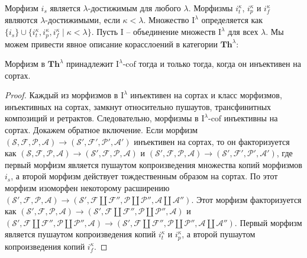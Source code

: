 \documentclass[reqno]{amsart}
\theoremstyle{definition}
\theoremstyle{remark}
\newcommand{\bcat}[1]{\mathbf{#1}}
\newcommand{\Th}{\bcat{Th}}
\newcommand{\I}{\mathrm{I}}
\newcommand{\class}[2]{#1\text{-}\mathrm{#2}}
\newcommand{\Icof}[1][\I]{\class{#1}{cof}}
\begin{document}
Морфизм $i_s$ является $\lambda$-достижимым для любого $\lambda$.
Морфизмы $i_t^\kappa$, $i_p^\kappa$ и $i_f^\kappa$ являются $\lambda$-достижимыми, если $\kappa < \lambda$.
Множество $\I^\lambda$ определяется как $\{ i_s \} \cup \{ i_t^\kappa, i_p^\kappa, i_f^\kappa \mid \kappa < \lambda \}$.
Пусть $\I$ -- объединение множеств $\I^\lambda$ для всех $\lambda$.
Мы можем привести явное описание корасслоений в категории $\Th^\lambda$:

\begin{prop}[th-cof]
Морфизм в $\Th^\lambda$ принадлежит $\Icof[\I^\lambda]$ тогда и только тогда, когда он инъективен на сортах.
\end{prop}
\begin{proof}
Каждый из морфизмов в $\I^\lambda$ инъективен на сортах и класс морфизмов, инъективных на сортах, замкнут относительно пушаутов, трансфинитных композиций и ретрактов.
Следовательно, морфизмы в $\Icof[\I^\lambda]$ инъективны на сортах.
Докажем обратное включение.
Если морфизм $(\mathcal{S},\mathcal{F},\mathcal{P},\mathcal{A}) \to (\mathcal{S}',\mathcal{F}',\mathcal{P}',\mathcal{A}')$ инъективен на сортах,
то он факторизуется как $(\mathcal{S},\mathcal{F},\mathcal{P},\mathcal{A}) \to (\mathcal{S}',\mathcal{F},\mathcal{P},\mathcal{A})$ и $(\mathcal{S}',\mathcal{F},\mathcal{P},\mathcal{A}) \to (\mathcal{S}',\mathcal{F}',\mathcal{P}',\mathcal{A}')$,
где первый морфизм является пушаутом копроизведения множества копий морфизмов $i_s$, а второй морфизм действует тождественным образом на сортах.
По  этот морфизм изоморфен некоторому расширению $(\mathcal{S}',\mathcal{F},\mathcal{P},\mathcal{A}) \to (\mathcal{S}', \mathcal{F} \amalg \mathcal{F}'', \mathcal{P} \amalg \mathcal{P}'', \mathcal{A} \amalg \mathcal{A}'')$.
Этот морфизм факторизуется как $(\mathcal{S}',\mathcal{F},\mathcal{P},\mathcal{A}) \to (\mathcal{S}', \mathcal{F} \amalg \mathcal{F}'', \mathcal{P} \amalg \mathcal{P}'', \mathcal{A})$ и
$(\mathcal{S}', \mathcal{F} \amalg \mathcal{F}'', \mathcal{P} \amalg \mathcal{P}'', \mathcal{A}) \to (\mathcal{S}', \mathcal{F} \amalg \mathcal{F}'', \mathcal{P} \amalg \mathcal{P}'', \mathcal{A} \amalg \mathcal{A}'')$.
Первый морфизм является пушаутом копроизведения копий $i_t^\kappa$ и $i_p^\kappa$, а второй пушаутом копроизведения копий $i_f^\kappa$.
\end{proof}
\end{document}
